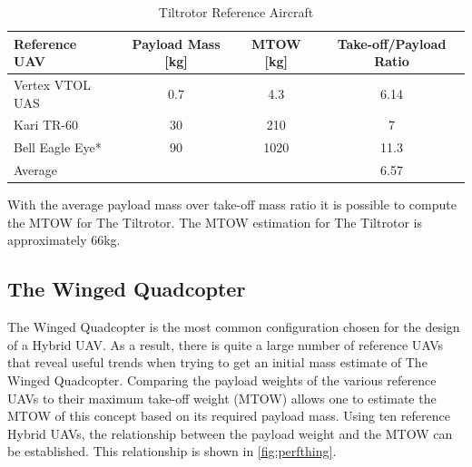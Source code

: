 


\begin{table}[h]
\centering
\caption{Tiltrotor Reference Aircraft}
\label{tab:Tilt}
    \begin{tabular}{lccc}
        \toprule
        \textbf{Reference UAV}   & \textbf{Payload Mass [kg]} & \textbf{MTOW [kg]} & \textbf{Take-off/Payload Ratio} \\\midrule
        Vertex VTOL UAS & 0.7               & 4.3       & 6.14               \\\hdashline
        Kari TR-60      & 30                & 210       & 7                  \\\hdashline
        Bell Eagle Eye*  & 90                & 1020      & 11.3               \\\midrule
        Average         &                   &           & 6.57                   \\\bottomrule
    \end{tabular}
\end{table}

With the average payload mass over take-off mass ratio it is possible to compute the MTOW for The Tiltrotor. The MTOW estimation for The Tiltrotor is approximately 66kg.


\subsection{The Winged Quadcopter}
The Winged Quadcopter is the most common configuration chosen for the design of a Hybrid UAV. As a result, there is quite a large number of reference UAVs that reveal useful trends when trying to get an initial mass estimate of The Winged Quadcopter. Comparing the payload weights of the various reference UAVs to their maximum take-off weight (MTOW) allows one to estimate the MTOW of this concept based on its required payload mass. Using ten reference Hybrid UAVs, the relationship between the payload weight and the MTOW can be established. This relationship is shown in \autoref{fig:perfthing}.


